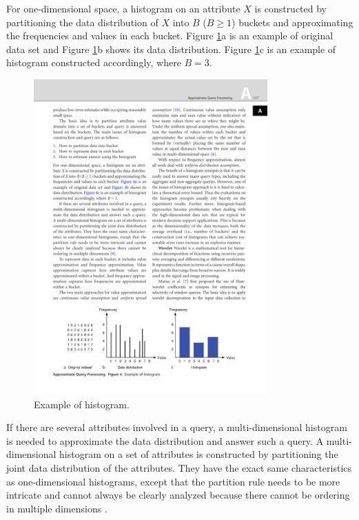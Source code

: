 \documentclass[twocolumn]{article}
\begin{document}
For one-dimensional space, a histogram on an attribute $X$ is constructed by partitioning the data distribution of $X$ into $B$ ($B \geq 1$) buckets and approximating the frequencies and values in each bucket. 
Figure \ref{fig:histogram}a is an example of original data set and Figure \ref{fig:histogram}b shows its data distribution. 
Figure \ref{fig:histogram}c is an example of histogram constructed accordingly, where $B = 3$.
\begin{figure}[htb]
        \centering
        \includegraphics[width=0.8\textwidth]{histogram-example.pdf}
        \caption{Example of histogram.}
        \label{fig:histogram}
\end{figure}

If there are several attributes involved in a query, a multi-dimensional histogram is needed to approximate the data distribution and answer such a query. A multi-dimensional histogram on a set of attributes is constructed by partitioning the joint data distribution of the attributes. They have the exact same characteristics as one-dimensional histograms, except that the partition rule needs to be more intricate and cannot always be clearly analyzed because there cannot be ordering in multiple dimensions \cite{Poosala:1997}.
\end{document}
